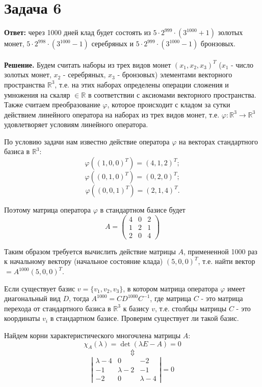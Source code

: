 \documentclass{article}
\begin{document}
\section*{Задача 6}
{\bf Ответ:} через 1000 дней клад будет состоять из $5\cdot2^{999}\cdot(3^{1000}+1)$ золотых монет, $5\cdot2^{998}\cdot(3^{1000}-1)$ серебряных и  $5\cdot2^{999}\cdot(3^{1000}-1)$ бронзовых.
\\
\\
{\bf Решение.} Будем считать наборы из трех видов монет $(x_1,x_2,x_3)^T$ ($x_1$ - число золотых монет, $x_2$ - серебряных, $x_3$ - бронзовых) элементами векторного пространства $\mathbb{R}^3$, т.е. на этих наборах определены операции сложения и умножения на скаляр $\in \mathbb{R}$ в соответствии с аксиомами векторного пространства. Также считаем преобразование $\varphi$, которое происходит с кладом за сутки действием линейного оператора на наборах из трех видов монет, т.е. $\varphi : \mathbb{R}^3\rightarrow\mathbb{R}^3$ удовлетворяет условиям линейного оператора. 
\par
По условию задачи нам известно действие оператора $\varphi$ на векторах стандартного базиса в $\mathbb{R}^3$:
$$\varphi((1,0,0)^T)=(4, 1, 2)^T;$$
$$\varphi((0,1,0)^T)=(0, 2, 0)^T;$$ 
$$\varphi((0,0,1)^T)=(2, 1, 4)^T.$$
\par
Поэтому матрица оператора $\varphi$ в стандартном базисе будет
$$A=\left(\begin{array}{rrr}4 & 0 & 2\\1 & 2 & 1\\2 & 0 & 4\end{array}\right)$$
\par
Таким образом требуется вычислить действие матрицы $A$, примененной 1000 раз к начальному вектору (начальное состояние клада) $(5,0,0)^T$, т.е. найти вектор $=A^{1000}(5,0,0)^T$. 
\par
Если существует базис $v=\{v_1, v_2, v_3\}$,  в котором матрица оператора $\varphi$ имеет диагональный вид $D$, тогда $A^{1000}=CD^{1000}C^{-1}$, где матрица $C$ - это матрица перехода от стандартного базиса в $\mathbb{R}^3$ к базису $v$, т.е. столбцы матрицы $C$ - это координаты $v_i$ в стандартном базисе. Проверим существует ли такой базис.
\par
Найдем корни характеристического многочлена матрицы $A$:
$$\chi_A(\lambda)=\det(\lambda E - A)=0$$
$$\Updownarrow$$
$$\left|\begin{array}{rrr}\lambda-4 & 0 & -2\\-1 & \lambda-2 & -1\\-2 & 0 & \lambda-4\end{array}\right|=0$$
\end{document}
